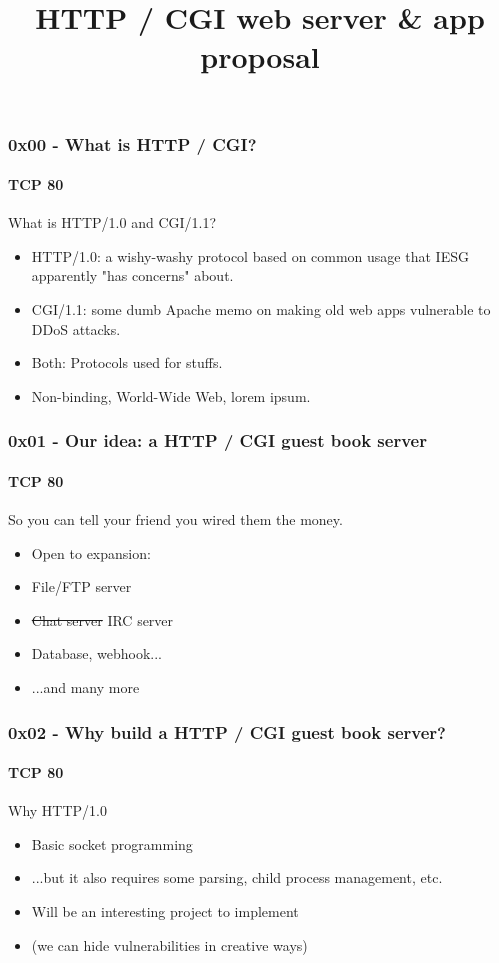 \documentclass {beamer}
\title {HTTP / CGI web server \& app proposal}
\begin{document}
\begin{frame}
  \titlepage
\end{frame}

\begin{frame}
  \frametitle{0x00 - What is HTTP / CGI?}
  \framesubtitle{TCP 80}

  What is HTTP/1.0 and CGI/1.1?

  \begin{itemize}
    \item<1-> HTTP/1.0: a wishy-washy protocol based on common usage that IESG apparently "has concerns" about.
    \item<2-> CGI/1.1: some dumb Apache memo on making old web apps vulnerable to DDoS attacks.
    \item<3-> Both: Protocols used for stuffs.
    \item<3-> Non-binding, World-Wide Web, lorem ipsum.
  \end{itemize}
\end{frame}

\begin{frame}
  \frametitle{0x01 - Our idea: a HTTP / CGI guest book server}
  \framesubtitle{TCP 80}

  So you can tell your friend you wired them the money.

  \begin{itemize}
    \item<1-> Open to expansion:
    \item<2-> File/FTP server
    \item<3-> \sout{Chat server} IRC server
    \item<4-> Database, webhook...
    \item<5-> ...and many more
  \end{itemize}
\end{frame}

\begin{frame}
  \frametitle{0x02 - Why build a HTTP / CGI guest book server?}
  \framesubtitle{TCP 80}

  Why HTTP/1.0

  \begin{itemize}
    \item<1-> Basic socket programming
    \item<2-> ...but it also requires some parsing, child process management, etc.
    \item<3-> Will be an interesting project to implement
    \item<3-> (we can hide vulnerabilities in creative ways)
  \end{itemize}
\end{frame}
\end{document}

